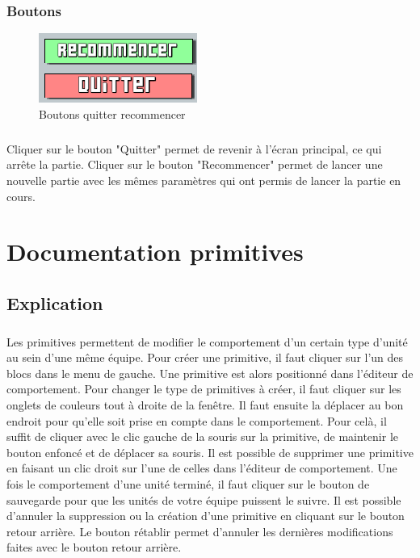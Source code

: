 \documentclass{report}
\begin{document}
\subsection{Boutons}
\begin{figure}[!h]
	\centering
		\includegraphics[scale=0.80]{quitter.png}
	\caption{Boutons quitter recommencer}
\end{figure}
\paragraph{}
Cliquer sur le bouton "Quitter" permet de revenir à l'écran principal, ce qui arrête la partie. \newline
Cliquer sur le bouton "Recommencer" permet de lancer une nouvelle partie avec les mêmes paramètres qui ont permis de lancer la partie en cours.

\chapter{Documentation primitives}
\section{Explication}
\paragraph{}
Les primitives permettent de modifier le comportement d'un certain type d'unité au sein d'une même équipe. Pour créer une primitive, il faut cliquer sur l'un des blocs dans le menu de gauche. Une primitive est alors positionné dans l'éditeur de comportement. \newline
Pour changer le type de primitives à créer, il faut cliquer sur les onglets de couleurs tout à droite de la fenêtre. \newline
Il faut ensuite la déplacer au bon endroit pour qu'elle soit prise en compte dans le comportement. Pour celà, il suffit de cliquer avec le clic gauche de la souris sur la primitive, de maintenir le bouton enfoncé et de déplacer sa souris. \newline
Il est possible de supprimer une primitive en faisant un clic droit sur l'une de celles dans l'éditeur de comportement.\newline
Une fois le comportement d'une unité terminé, il faut cliquer sur le bouton de sauvegarde pour que les unités de votre équipe puissent le suivre. \newline
Il est possible d'annuler la suppression ou la création d'une primitive en cliquant sur le bouton retour arrière.  \newline
Le bouton rétablir permet d'annuler les dernières modifications faites avec le bouton retour arrière.
\end{document}
